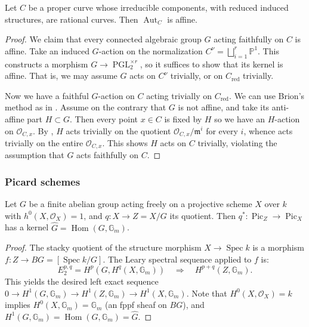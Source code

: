 \documentclass[reqno, letterpaper]{amsart}
\numberwithin{equation}{subsection}
\let\to\longrightarrow
\newcommand{\GG}{\mathbb{G}}
\newcommand{\PP}{\mathbb{P}}
\DeclareMathOperator{\Hom}{Hom}
\DeclareMathOperator{\Aut}{Aut}
\DeclareMathOperator{\PGL}{PGL}
\DeclareMathOperator{\Spec}{Spec}
\DeclareMathOperator{\Pic}{Pic}
\DeclareMathOperator{\red}{red}
\begin{document}
		\begin{lemma} \label{lem:automorphism of chain of rational curves}
			Let $C$ be a proper curve whose irreducible components, with reduced induced structures, are rational curves. Then $\Aut_C$ is affine.
		\end{lemma}
		\begin{proof}
			We claim that every connected algebraic group $G$ acting faithfully on $C$ is affine. Take an induced $G$-action on the normalization $C^\nu = \bigsqcup_{i=1}^r \PP^1$. This constructs a morphism $G \to \PGL_2^{\times r}$, so it suffices to show that its kernel is affine. That is, we may assume $G$ acts on $C^\nu$ trivially, or on $C_{\red}$ trivially.
			
			Now we have a faithful $G$-action on $C$ acting trivially on $C_{\red}$. We can use Brion's method as in . Assume on the contrary that $G$ is not affine, and take its anti-affine part $H \subset G$. Then every point $x \in C$ is fixed by $H$ so we have an $H$-action on $\mathcal O_{C, x}$. By \cite[Lemma~1.1]{brion09}, $H$ acts trivially on the quotient $\mathcal O_{C, x}/\mathfrak m^i$ for every $i$, whence acts trivially on the entire $\mathcal O_{C,x}$. This shows $H$ acts on $C$ trivially, violating the assumption that $G$ acts faithfully on $C$.
		\end{proof}
		
		
		
		\subsubsection{Picard schemes}
			\begin{lemma} \label{lem:Picard scheme of free quotient}
				Let $G$ be a finite abelian group acting freely on a projective scheme $X$ over $k$ with $h^0 (X, \mathcal O_X) = 1$, and $q : X \to Z = X/G$ its quotient. Then $q^* : \Pic_Z \to \Pic_X$ has a kernel $\hat G = \Hom (G, \GG_m)$.
			\end{lemma}
			\begin{proof}
				The stacky quotient of the structure morphism $X \to \Spec k$ is a morphism $f : Z \to BG = [\Spec k/G]$. The Leary spectral sequence applied to $f$ is:
				\[ E_2^{p,q} = H^p (G, H^q (X, \GG_m)) \quad \Longrightarrow \quad H^{p+q} (Z, \GG_m) .\]
				This yields the desired left exact sequence $0 \to H^1 (G, \GG_m) \to H^1 (Z, \GG_m) \to H^1 (X, \GG_m)$. Note that $H^0 (X, \mathcal O_X) = k$ implies $H^0 (X, \GG_m) = \GG_m$ (an fppf sheaf on $BG$), and $H^1 (G, \GG_m) = \Hom (G, \GG_m) = \hat G$.
			\end{proof}
			
\end{document}
